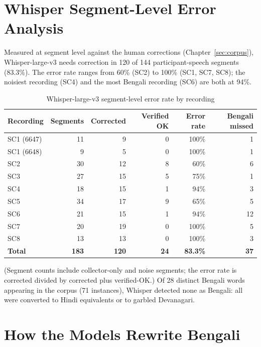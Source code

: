 \documentclass[11pt,a4paper]{report}
\begin{document}
\section{Whisper Segment-Level Error Analysis}

Measured at segment level against the human corrections (Chapter~\ref{sec:corpus}), Whisper-large-v3 needs correction in 120 of 144 participant-speech segments (83.3\%). The error rate ranges from 60\% (SC2) to 100\% (SC1, SC7, SC8); the noisiest recording (SC4) and the most Bengali recording (SC6) are both at 94\%.

\begin{table}[H]
\centering
\caption{Whisper-large-v3 segment-level error rate by recording}
\label{tab:whisperseg}
\small
\setlength{\tabcolsep}{4pt}
\begin{tabular}{lrrrrr}
\toprule
\textbf{Recording} & \textbf{Segments} & \textbf{Corrected} & \textbf{Verified OK} & \textbf{Error rate} & \textbf{Bengali missed} \\
\midrule
SC1 (6647) & 11 &  9 & 0 & 100\% &  1 \\
SC1 (6648) &  9 &  5 & 0 & 100\% &  1 \\
SC2        & 30 & 12 & 8 &  60\% &  6 \\
SC3        & 27 & 15 & 5 &  75\% &  1 \\
SC4        & 18 & 15 & 1 &  94\% &  3 \\
SC5        & 34 & 17 & 9 &  65\% &  5 \\
SC6        & 21 & 15 & 1 &  94\% & 12 \\
SC7        & 20 & 19 & 0 & 100\% &  5 \\
SC8        & 13 & 13 & 0 & 100\% &  3 \\
\midrule
\textbf{Total} & \textbf{183} & \textbf{120} & \textbf{24} & \textbf{83.3\%} & \textbf{37} \\
\bottomrule
\end{tabular}
\end{table}

(Segment counts include collector-only and noise segments; the error rate is corrected divided by corrected plus verified-OK.) Of 28 distinct Bengali words appearing in the corpus (71 instances), Whisper detected none as Bengali: all were converted to Hindi equivalents or to garbled Devanagari.

\section{How the Models Rewrite Bengali}
\end{document}
